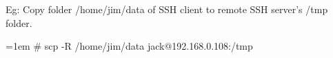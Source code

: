 \begin{flushleft}
\begin{itemize}
	\bigskip
	Eg: Copy folder /home/jim/data of SSH client to remote SSH server's /tmp folder.
	\begin{tcolorbox}[breakable,notitle,boxrule=-0pt,colback=black,colframe=black]
		\color{green}
		\font=1em
		\# scp -R /home/jim/data  jack@192.168.0.108:/tmp
		\font=4pt
	\end{tcolorbox}
		
\end{itemize}

\end{flushleft}
\newpage


